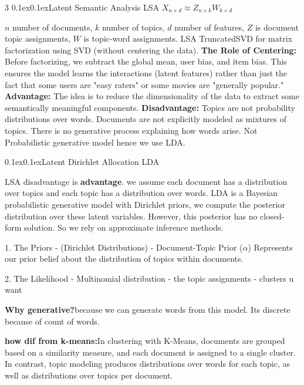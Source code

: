 \documentclass[8pt,landscape]{article}
\makeatletter
\renewcommand{\section}{\@startsection{section}{2}{0pt}%
    {0.1ex}{0.1ex}{\fontsize{8}{9}\bfseries\color{red}}}
\newcommand{\smalltext}[1]{{\fontsize{7}{8}\selectfont\sloppy #1\par}}
\makeatother
\begin{document}
\begin{multicols}{3}
\section{Latent Semantic Analysis LSA $X_{n \times d} \approx Z_{n \times k} W_{k \times d}$}
\smalltext{
$n$ number of documents, $k$ number of topics, $d$ number of features, $Z$ is document topic assignments, $W$ is topic-word assignments.
LSA TruncatedSVD for matrix factorization using SVD (without centering the data).  
\textbf{The Role of Centering:} Before factorizing, we subtract the global mean, user bias, and item bias. This ensures the model learns the interactions (latent features) rather than just the fact that some users are "easy raters" or some movies are "generally popular."
\textbf{Advantage: }
The idea is to reduce the dimensionality of the data to extract some semantically meaningful components.
\textbf{Disadvantage: }
Topics are not probability distributions over words.
Documents are not explicitly modeled as mixtures of topics.
There is no generative process explaining how words arise.
Not Probabilistic generative model hence we use LDA.
}

\section{Latent Dirichlet Allocation LDA}
\smalltext{
LSA disadvantage is \textbf{advantage}. we assume each document has a distribution over topics and each topic has a distribution over words. 
LDA is a Bayesian probabilistic generative model with Dirichlet priors, we compute the posterior distribution over these latent variables. However, this posterior has no closed-form solution. So we rely on approximate inference methods.

1. The Priors - (Dirichlet Distributions) - Document-Topic Prior ($\alpha$) Represents our prior belief about the distribution of topics within documents.

2. The Likelihood - Multinomial distribution - the topic assignments - clusters u want

\textbf{Why generative?}because we can generate words from this model. Its discrete because of count of words.

\textbf{how dif from k-means:}In clustering with K-Means, documents are grouped based on a similarity measure, and each document is assigned to a single cluster. In contrast, topic modeling produces distributions over words for each topic, as well as distributions over topics per document.

}
\end{multicols}
\end{document}
